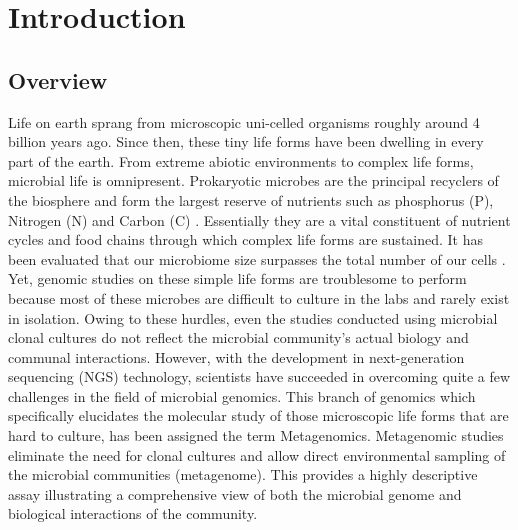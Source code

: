 \chapter{Introduction}
 \setcounter{page}{1}

\section{Overview}
Life on earth sprang from microscopic uni-celled organisms roughly around 4 billion years ago. Since then, these tiny life forms have been dwelling in every part of the earth. From extreme abiotic environments to complex life forms, microbial life is omnipresent. Prokaryotic microbes are the principal recyclers of the biosphere and form the largest reserve of nutrients such as phosphorus (P), Nitrogen (N) and Carbon (C) \cite{ref1}. Essentially they are a vital constituent of nutrient cycles and food chains through which complex life forms are sustained. It has been evaluated that our microbiome size surpasses the total number of our cells \cite{ref2}. Yet, genomic studies on these simple life forms are troublesome to perform because most of these microbes are difficult to culture in the labs and rarely exist in isolation. Owing to these hurdles, even the studies conducted using microbial clonal cultures do not reflect the microbial community's actual biology and communal interactions. However, with the development in next-generation sequencing (NGS) technology, scientists have succeeded in overcoming quite a few challenges in the field of microbial genomics. This branch of genomics which specifically elucidates the molecular study of those microscopic life forms that are hard to culture, has been assigned the term Metagenomics. Metagenomic studies eliminate the need for clonal cultures and allow direct environmental sampling of the microbial communities (metagenome). This provides a highly descriptive assay illustrating a comprehensive view of both the microbial genome and biological interactions of the community.

